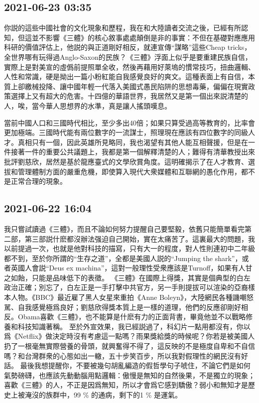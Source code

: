\documentclass[twocolumn]{ctexart}
\begin{document}
\subsection*{2021-06-23 03:35}

你説的這些中國社會的文化現象和歷程，我在和大陸讀者交流之後，已經有所認知，但這並不影響《三體》的核心敘事處處顛倒是非的事實：不但在基礎對應應用科研的價值評估上，他説的與正道剛好相反，就連宣傳“謀略”這些Cheap tricks，全世界哪有玩得過Anglo-Saxon的民族？《三體》浮面上似乎是要重建民族自信，實際上是對美宣的虛僞前提照單全收，然後再藉用好萊塢的慣常技巧，扭曲邏輯、人性和常識，硬是拗出一篇小粉紅能自我感覺良好的爽文。這種表面上有自信，本質上卻繳械投降、讓中國年輕一代落入美國式愚民陷阱的思想毒藥，偏偏在現實政策選擇上又有超大的危害。十四億的華語世界，我居然又是第一個出來説清楚的人，唉，當今華人思想界的水準，真是讓人搖頭嘆息。

當前中國人口和三國時代相比，至少多出40倍；如果只算受過高等教育的，比率會更加極端。三國時代能有兩位數字的一流謀士，照理現在應該有四位數字的同級人才。真相只有一個，因此英雄所見略同，我也渴望有其他人能互相聲援，但是在一件接著一件的重要公共議題上，我都是第一個解釋清楚的人；難得有清華教授出來批評劉慈欣，居然是基於龍應臺式的文學欣賞角度。這明確揭示了在人才教育、選拔和管理體制方面的嚴重危機，即使算入現代大衆媒體和互聯網的愚化作用，都不是正常合理的現象。
\subsection*{2021-06-22 16:04}

我只嘗試讀過《三體》，而且不論如何努力提醒自己要堅毅，依舊只能簡單看完第二部，第三部説什麽都沒辦法强迫自己開始，實在太痛苦了。這裏最大的問題，我以前提過一次，也就是他對科技的描寫，只有大一的程度，對人性則連初中二年級都不到，至於你所謂的“生存之道”，全都是美國人説的“Jumping the shark”，或者英國人會説“Deus ex machina”，這對一般理性受衆應該是Turnoff，如果有人甘之如飴，只能是品味低下的表徵。
《三體》在國際上得獎，其實是個典型的白左政治正確；別忘了，白左正是一手打擊中共官方，另一手則提拔可以渲染的亞裔樣本人物。《BBC》最近雇了黑人女星來重拍《Anne Boleyn》，大陸網民各種譏嘲怒駡、自我感覺極爲良好；劉慈欣得獎本質上是一樣的道理，他們的反應卻剛好相反。Obama喜歡《三體》，也不能算是什麽有力的正面背書，畢竟他並不以戰略修養和科技知識著稱。
至於外宣效果，我已經説過了，科幻片一點用都沒有，你以爲《Netflix》做決定時沒有考慮這一點嗎？雨果獎給獎的時候呢？你若是被美國人扔了一根毫無實際營養的骨頭，就興奮得不得了，這反映的不是極度自卑和不自信嗎？和台灣群衆的心態如出一轍，五十步笑百步，所以我對假理性的網民沒有好話。
最後我想提醒你，不要被幾句胡亂編造的假哲學句子唬住，不論它們是如何氣勢磅礴，也應該先動動腦用點邏輯：傲慢是無知的自然後果，不是獨立的現象；喜歡《三體》的人，不正是因爲無知，所以才會爲它感到驕傲？弱小和無知才是歷史上被淹沒的族群中，99 \% 的通病，剩下的1 \% 是運氣。
\end{document}
